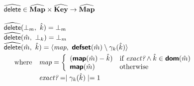 $\begin{array}{l}
\wsf{delete} \in \AMap \times \AKey \rightarrow \AMap \\\\

\wsf{delete}(\bot_m,\ \hat{k}) = \bot_m \\
\wsf{delete}(\hat{m},\ \bot_k) = \bot_m \\

\wsf{delete}(\hat{m},\ \hat{k}) =
\langle \emph{map},\ \Defset(\hat{m}) \setminus \gamma_k(\hat{k}) \rangle \vspace{1mm}\\
\quad \begin{array}{rl} \textrm{where}
& \emph{map} = \left \{ \begin{array}{ll}
(\Map(\hat{m}) - \hat{k})
& \textrm{if } \emph{exact?} \land \hat{k} \in \Dom(\hat{m}) \\
\Map(\hat{m})
& \textrm{otherwise} \\
\end{array} \right. \vspace{1mm}\\

& \emph{exact?} = \mid \gamma_k(\hat{k}) \mid = 1 \\
\end{array} \\
\end{array}$

